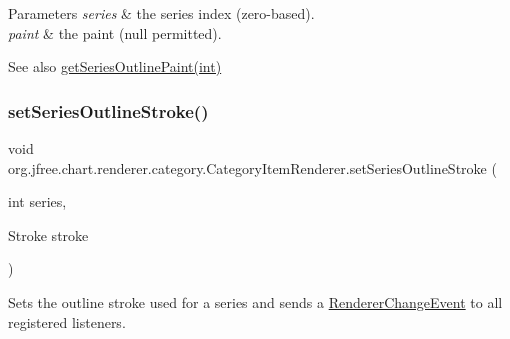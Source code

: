 \begin{DoxyParams}{Parameters}
{\em series} & the series index (zero-\/based). \\
\hline
{\em paint} & the paint ({\ttfamily null} permitted).\\
\hline
\end{DoxyParams}
\begin{DoxySeeAlso}{See also}
\mbox{\hyperlink{interfaceorg_1_1jfree_1_1chart_1_1renderer_1_1category_1_1_category_item_renderer_a269a247e3438efdbf4f9620751e650e7}{get\+Series\+Outline\+Paint(int)}} 
\end{DoxySeeAlso}
\mbox{\label{interfaceorg_1_1jfree_1_1chart_1_1renderer_1_1category_1_1_category_item_renderer_a07b423a5d7e9af0bd6a5a68b3ac5cd3f}} 
\subsubsection{\texorpdfstring{set\+Series\+Outline\+Stroke()}{setSeriesOutlineStroke()}}
{\footnotesize\ttfamily void org.\+jfree.\+chart.\+renderer.\+category.\+Category\+Item\+Renderer.\+set\+Series\+Outline\+Stroke (\begin{DoxyParamCaption}\item[{int}]{series,  }\item[{Stroke}]{stroke }\end{DoxyParamCaption})}

Sets the outline stroke used for a series and sends a \mbox{\hyperlink{}{Renderer\+Change\+Event}} to all registered listeners.


